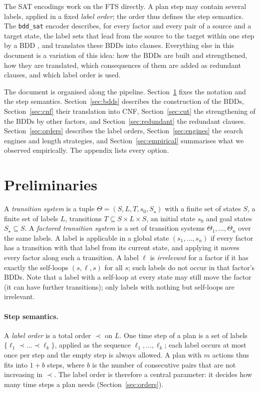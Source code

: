 \documentclass[manuscript, screen]{jair}
\newcommand{\opt}[1]{\texttt{#1}}
\newcommand{\bddsat}{\opt{bdd\_sat}\xspace}
\begin{document}
The SAT encodings work on the FTS directly. A plan step may contain several labels, applied in a
fixed \emph{label order}; the order thus defines the step semantics. The \bddsat encoder describes,
for every factor and every pair of a source and a target state, the label sets that lead from the
source to the target within one step by a BDD \parencite{bryant-ieee1986}, and translates these BDDs
into clauses. Everything else in this document is a variation of this idea: how the BDDs are built
and strengthened, how they are translated, which consequences of them are added as redundant
clauses, and which label order is used.

The document is organised along the pipeline. Section~\ref{sec:prelim} fixes the notation and the
step semantics. Section~\ref{sec:bdds} describes the construction of the BDDs,
Section~\ref{sec:cnf} their translation into CNF, Section~\ref{sec:cut} the strengthening of the BDDs
by other factors, and Section~\ref{sec:redundant} the redundant clauses. Section~\ref{sec:orders}
describes the label orders, Section~\ref{sec:engines} the search engines and length strategies, and
Section~\ref{sec:empirical} summarises what we observed empirically. The appendix lists every
option.

\section{Preliminaries}\label{sec:prelim}

A \emph{transition system} is a tuple $\Theta = (S, L, T, s_0, S_\star)$ with a finite set of states
$S$, a finite set of labels $L$, transitions $T \subseteq S \times L \times S$, an initial state
$s_0$ and goal states $S_\star \subseteq S$. A \emph{factored transition system} is a set of
transition systems $\Theta_1, \dots, \Theta_n$ over the same labels. A label is applicable in a
global state $(s_1,\dots,s_n)$ if every factor has a transition with that label from its current
state, and applying it moves every factor along such a transition. A label $\ell$ is
\emph{irrelevant} for a factor if it has exactly the self-loops $(s,\ell,s)$ for all $s$; such labels
do not occur in that factor's BDDs. Note that a label with a self-loop at every state may still move
the factor (it can have further transitions); only labels with nothing but self-loops are
irrelevant.

\paragraph{Step semantics.} A \emph{label order} is a total order $\prec$ on $L$. One time step of a
plan is a set of labels $\{\ell_1 \prec \dots \prec \ell_k\}$, applied as the sequence
$\ell_1,\dots,\ell_k$; each label occurs at most once per step and the empty step is always allowed.
A plan with $m$ actions thus fits into $1 + b$ steps, where $b$ is the number of consecutive pairs
that are not increasing in $\prec$. The label order is therefore a central parameter: it decides how
many time steps a plan needs (Section~\ref{sec:orders}).
\end{document}
